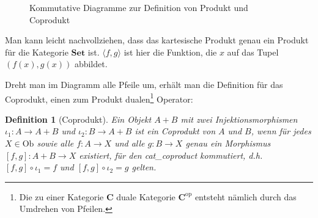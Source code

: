 \documentclass[11pt, a4paper, bibgerm]{book}
\newcommand\abb{}
\newcommand\ato{\rightarrow} %
\newtheorem{defini}{Definition}
\newcommand{\defi}[2]{%
  \begin{defini}[#1]
    \label{def:#1}
    #2
  \end{defini}
}
\begin{document}
\begin{figure}
  \centering
  \caption{Kommutative Diagramme zur Definition von Produkt und Coprodukt}
\end{figure}

Man kann leicht nachvollziehen, dass das kartesische Produkt genau ein
Produkt für die Kategorie $\mathbf{Set}$ ist. $\langle f,g \rangle$ ist
hier die Funktion, die $x$ auf das Tupel $(f(x), g(x))$ abbildet.

Dreht man im Diagramm alle Pfeile um, erhält man die Definition für das
Coprodukt, einen zum Produkt dualen\footnote{Die zu einer Kategorie
  $\mathbf{C}$ duale Kategorie $\mathbf{C}^{\mathrm{op}}$ entsteht
  nämlich durch das Umdrehen von Pfeilen.} Operator:

\defi{Coprodukt}{ Ein Objekt $A + B$ mit zwei Injektionsmorphismen
  $\iota_1 : A \ato A + B$ und $\iota_2 : B \ato A + B$ ist ein
  Coprodukt von $A$ und $B$, wenn für jedes $X \in \mathrm{Ob}$ sowie
  alle $f : A \ato X$ und alle $g : B \ato X$ genau ein Morphismus
  $[f,g] : A + B \ato X$ existiert, für den \abb{cat_coproduct}
  kommutiert, d.h.  $[f,g] \circ \iota_1 = f$ und $[f,g] \circ \iota_2 =
  g$ gelten.  }
\end{document}
